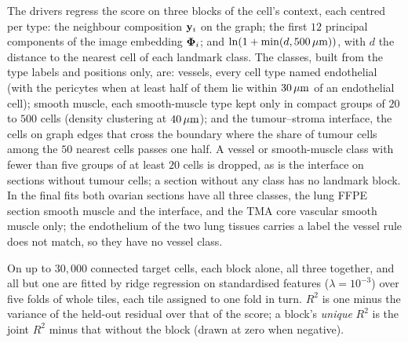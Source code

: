 The drivers regress the score on three blocks of the cell's context, each centred per type: the neighbour composition $\mathbf{y}_i$ on the graph; the first $12$ principal components of the image embedding $\boldsymbol{\Phi}_i$; and $\ln(1 + \min(d, 500\,\mu\text{m}))$, with $d$ the distance to the nearest cell of each landmark class. The classes, built from the type labels and positions only, are: vessels, every cell type named endothelial (with the pericytes when at least half of them lie within $30\,\mu\text{m}$ of an endothelial cell); smooth muscle, each smooth-muscle type kept only in compact groups of $20$ to $500$ cells (density clustering at $40\,\mu\text{m}$); and the tumour--stroma interface, the cells on graph edges that cross the boundary where the share of tumour cells among the $50$ nearest cells passes one half. A vessel or smooth-muscle class with fewer than five groups of at least $20$ cells is dropped, as is the interface on sections without tumour cells; a section without any class has no landmark block. In the final fits both ovarian sections have all three classes, the lung FFPE section smooth muscle and the interface, and the TMA core vascular smooth muscle only; the endothelium of the two lung tissues carries a label the vessel rule does not match, so they have no vessel class.

On up to $30{,}000$ connected target cells, each block alone, all three together, and all but one are fitted by ridge regression on standardised features ($\lambda = 10^{-3}$) over five folds of whole tiles, each tile assigned to one fold in turn. $R^2$ is one minus the variance of the held-out residual over that of the score; a block's \emph{unique} $R^2$ is the joint $R^2$ minus that without the block (drawn at zero when negative).

